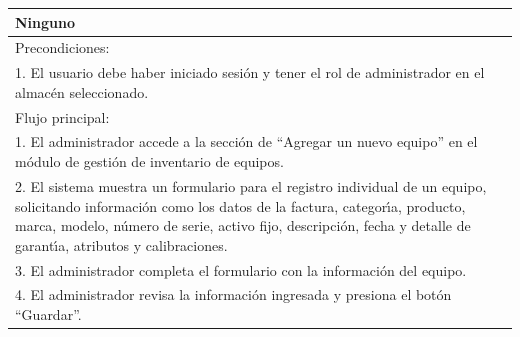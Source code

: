 \documentclass[stu, 12pt, letterpaper, donotrepeattitle, floatsintext, natbib]{apa7}
\begin{document}
\begin{longtable}{@{} p{16.5cm} @{}}
    Ninguno                                                                                                                                                                                                                                                                                    \\ \midrule
    Precondiciones:                                                                                                                                                                                                                                                                            \\
    1. El usuario debe haber iniciado sesi\'on y tener el rol de administrador en el almac\'en seleccionado.                                                                                                                                                                                   \\ \midrule
    Flujo principal:                                                                                                                                                                                                                                                                           \\
    1. El administrador accede a la secci\'on de ``Agregar un nuevo equipo'' en el m\'odulo de gesti\'on de inventario de equipos.                                                                                                                                                             \\
    2. El sistema muestra un formulario para el registro individual de un equipo, solicitando informaci\'on como los datos de la factura, categor\'{\i}a, producto, marca, modelo, n\'umero de serie, activo fijo, descripci\'on, fecha y detalle de garant\'{\i}a, atributos y calibraciones. \\
    3. El administrador completa el formulario con la informaci\'on del equipo.                                                                                                                                                                                                                \\
    4. El administrador revisa la informaci\'on ingresada y presiona el bot\'on ``Guardar''.                                                                                                                                                                                                   \\

\end{longtable}
\end{document}
